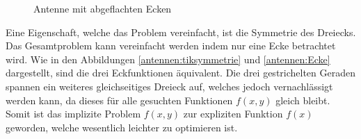 \begin{figure}[htbp]
\begin{minipage}[t]{0.45\textwidth}
		\caption{Antenne mit abgeflachten Ecken}
		\label{antennen:tikabgeflacht_kleiner}
	\end{minipage}
\end{figure}
\FloatBarrier
Eine Eigenschaft, welche das Problem vereinfacht, ist die Symmetrie des Dreiecks. 
Das Gesamtproblem kann vereinfacht werden indem nur eine Ecke betrachtet wird. 
Wie in den Abbildungen \ref{antennen:tiksymmetrie} und \ref{antennen:Ecke} dargestellt, sind die drei Eckfunktionen äquivalent. Die drei 
gestrichelten Geraden spannen ein weiteres gleichseitiges Dreieck auf, welches 
jedoch vernachlässigt werden kann, da dieses für alle gesuchten Funktionen $f(x,y)$ 
gleich bleibt. Somit ist das implizite Problem $f(x,y)$ zur expliziten Funktion $f(x)$ 
geworden, welche wesentlich leichter zu optimieren ist.
